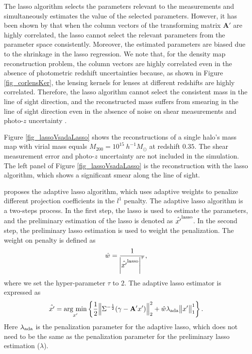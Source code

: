 The lasso algorithm selects the parameters relevant to the measurements and
simultaneously estimates the value of the selected parameters.  However, it has
been shown by \citet{AdaLASSO-Zou2006} that when the column vectors of the
transforming matrix $\mathbf{A'}$ are highly correlated, the lasso cannot
select the relevant parameters from the parameter space consistently.
Moreover, the estimated parameters are biased due to the shrinkage in the lasso
regression. We note that, for the density map reconstruction problem, the
column vectors are highly correlated even in the absence of photometric
redshift uncertainties because, as shown in Figure \ref{fig_corlensKer}, the
lensing kernels for lenses at different redshifts are highly correlated.
Therefore, the lasso algorithm cannot select the consistent mass in the line of
sight direction, and the reconstructed mass suffers from smearing in the line
of sight direction even in the absence of noise on shear measurements and
photo-$z$ uncertainty .

Figure \ref{fig_lassoVsadaLasso} shows the reconstructions of a single halo's
mass map with virial mass equals $M_{200}=10^{15} ~h^{-1}M_{\odot}$ at redshift
$0.35$. The shear measurement error and photo-$z$ uncertainty are not included
in the simulation.  The left panel of Figure \ref{fig_lassoVsadaLasso} is the
reconstruction with the lasso algorithm, which shows a significant smear along
the line of sight.

\citet{AdaLASSO-Zou2006} proposes the adaptive lasso algorithm, which uses
adaptive weights to penalize different projection coefficients in the $l^1$
penalty. The adaptive lasso algorithm is a two-steps process. In the first
step, the lasso is used to estimate the parameters, and the preliminary
estimation of the lasso is denoted as $\hat{x'}^{\rm{lasso}}$. In the second
step, the preliminary lasso estimation is used to weight the penalization. The
weight on penalty is defined as
\begin{equation}
\hat{w}= \frac{1}{\abs{\hat{x'}^{\rm{lasso}}}^\tau},
\end{equation}
where we set the hyper-parameter $\tau$ to $2$.  The adaptive lasso estimator is
expressed as
\begin{equation}\label{eq-lossFun}
\hat{x'}=\argmin_{x'} \left\{ \frac{1}{2} \norm{\Sigma^{-\frac{1}{2}}(\gamma-\mathbf{A'}x')}^2_2 +
\hat{w}\lambda_{\rm{ada}} \norm{x'}^1_1\right\}.
\end{equation}
Here $\lambda_{\rm{ada}}$ is the penalization parameter for the adaptive lasso,
which does not need to be the same as the penalization parameter for the
preliminary lasso estimation ($\lambda$).

